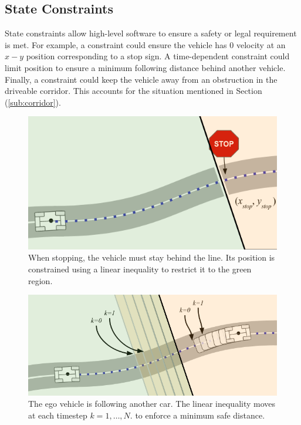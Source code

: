 \documentclass[letterpaper, 10 pt, conference]{ieeeconf}  %
\begin{document}
\subsection{State Constraints}\label{sub:constraints}
State constraints allow high-level software to ensure a safety or legal requirement is met. For example, a constraint could ensure the vehicle has 0 velocity at an $x-y$ position corresponding to a stop sign. A time-dependent constraint could limit position to ensure a minimum following distance behind another
vehicle. Finally, a constraint could keep the vehicle away from an obstruction in the driveable corridor. This accounts for the situation mentioned in Section (\ref{sub:corridor}).

\begin{figure}[h]
	\centering
	\includegraphics[width=0.9\linewidth]{figures/stop.png}
	\caption{When stopping, the vehicle must stay behind the line. Its position is constrained using a linear inequality to restrict it to the green region.} 
	\label{fig:stopsign}
\end{figure}

\begin{figure}[h]
	\centering
	\includegraphics[width=0.9\linewidth]{figures/following.png}
	\caption{The ego vehicle is following another car. The linear inequality moves at each timestep $k=1,\dots,N$. to enforce a minimum safe distance.}
	\label{fig:vehicle_in_front}
\end{figure}
\end{document}

